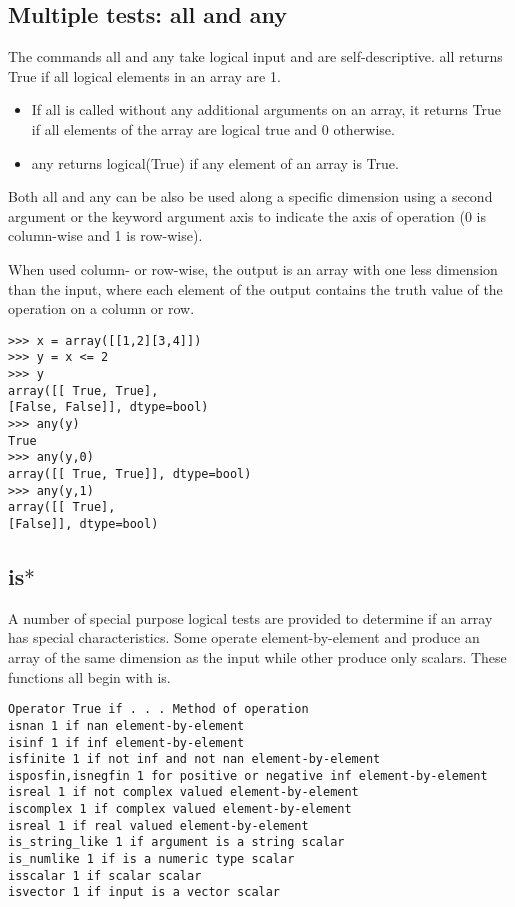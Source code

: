 \documentclass[KSmain.tex]{subfiles}
\begin{document}
\subsection{Multiple tests: all and any}
The commands all and any take logical input and are self-descriptive. all returns True if all logical elements
in an array are 1.
\begin{itemize}
\item  If all is called without any additional arguments on an array, it returns True if all
elements of the array are logical true and 0 otherwise. 
\item 
any returns logical(True) if any element of an array is True.
\end{itemize}
Both all and any can be also be used along a specific dimension using a second argument or the
keyword argument axis to indicate the axis of operation (0 is column-wise and 1 is row-wise). 

When used column- or row-wise, the output is an array with one less dimension than the input, where each element
of the output contains the truth value of the operation on a column or row.
\begin{framed}
\begin{verbatim}
>>> x = array([[1,2][3,4]])
>>> y = x <= 2
>>> y
array([[ True, True],
[False, False]], dtype=bool)
>>> any(y)
True
>>> any(y,0)
array([[ True, True]], dtype=bool)
>>> any(y,1)
array([[ True],
[False]], dtype=bool)
\end{verbatim}
\end{framed}

\subsection{ is$\ast$}
A number of special purpose logical tests are provided to determine if an array has special characteristics.
Some operate element-by-element and produce an array of the same dimension as the input while other
produce only scalars. These functions all begin with is.

\begin{verbatim}
Operator True if . . . Method of operation
isnan 1 if nan element-by-element
isinf 1 if inf element-by-element
isfinite 1 if not inf and not nan element-by-element
isposfin,isnegfin 1 for positive or negative inf element-by-element
isreal 1 if not complex valued element-by-element
iscomplex 1 if complex valued element-by-element
isreal 1 if real valued element-by-element
is_string_like 1 if argument is a string scalar
is_numlike 1 if is a numeric type scalar
isscalar 1 if scalar scalar
isvector 1 if input is a vector scalar
\end{verbatim}
\end{document}
